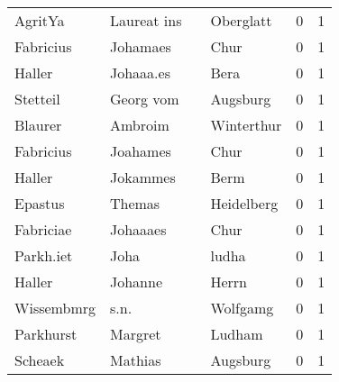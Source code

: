 \begin{tabular}{llllrr}
                  AgritYa &                        Laureat ins &             &                                   Oberglatt &          0 &         1 \\
                Fabricius &                           Johamaes &             &                                        Chur &          0 &         1 \\
                   Haller &                          Johaaa.es &             &                                        Bera &          0 &         1 \\
                 Stetteil &                          Georg vom &             &                                    Augsburg &          0 &         1 \\
                  Blaurer &                            Ambroim &             &                                  Winterthur &          0 &         1 \\
                Fabricius &                           Joahames &             &                                        Chur &          0 &         1 \\
                   Haller &                           Jokammes &             &                                        Berm &          0 &         1 \\
                  Epastus &                             Themas &             &                                  Heidelberg &          0 &         1 \\
                Fabriciae &                           Johaaaes &             &                                        Chur &          0 &         1 \\
                Parkh.iet &                               Joha &             &                                       ludha &          0 &         1 \\
                   Haller &                            Johanne &             &                                       Herrn &          0 &         1 \\
               Wissembmrg &                               s.n. &             &                                    Wolfgamg &          0 &         1 \\
                Parkhurst &                            Margret &             &                                      Ludham &          0 &         1 \\
                  Scheaek &                            Mathias &             &                                    Augsburg &          0 &         1 \\

\end{tabular}
